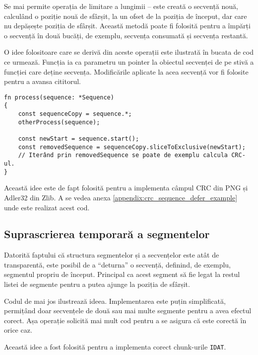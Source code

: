 \documentclass[a4paper,12pt]{report}
\begin{document}
Se mai permite operația de limitare a lungimii -- este creată o secvență nouă,
calculând o poziție nouă de sfârșit, la un ofset de la poziția de început,
dar care nu depășește poziția de sfârșit.
Această metodă poate fi folosită pentru a împărți o secvență în două bucăți, de exemplu,
secvența consumată și secvența restantă.

O idee folositoare care se derivă din aceste operații este ilustrată în bucata de cod ce urmează.
Funcția ia ca parametru un pointer la obiectul secvenței de pe stivă a funcției care deține secvența.
Modificările aplicate la acea secvență vor fi folosite pentru a avansa cititorul.

\begin{verbatim}
fn process(sequence: *Sequence)
{
    const sequenceCopy = sequence.*;
    otherProcess(sequence);

    const newStart = sequence.start();
    const removedSequence = sequenceCopy.sliceToExclusive(newStart);
    // Iterând prin removedSequence se poate de exemplu calcula CRC-ul.
}
\end{verbatim}

Această idee este de fapt folosită pentru a implementa câmpul \ac{CRC} din \ac{PNG} și Adler32 din Zlib.
A se vedea anexa \ref{appendix:crc_sequence_defer_example} unde este realizat acest cod.

\subsection{Suprascrierea temporară a segmentelor}

Datorită faptului că structura segmentelor și a secvențelor este atât de transparentă,
este posibil de a ``deturna'' o secvență, definind, de exemplu, segmentul propriu de început.
Principal ca acest segment să fie legat la restul listei de segmente pentru a putea ajunge la poziția de sfârșit.

Codul de mai jos ilustrează ideea.
Implementarea este puțin simplificată,
permițând doar secvențele de două sau mai multe segmente pentru a avea efectul corect.
Așa operație solicită mai mult cod pentru a se asigura că este corectă în orice caz.

Această idee a fost folosită pentru a implementa corect chunk-urile \texttt{IDAT}.
\end{document}
